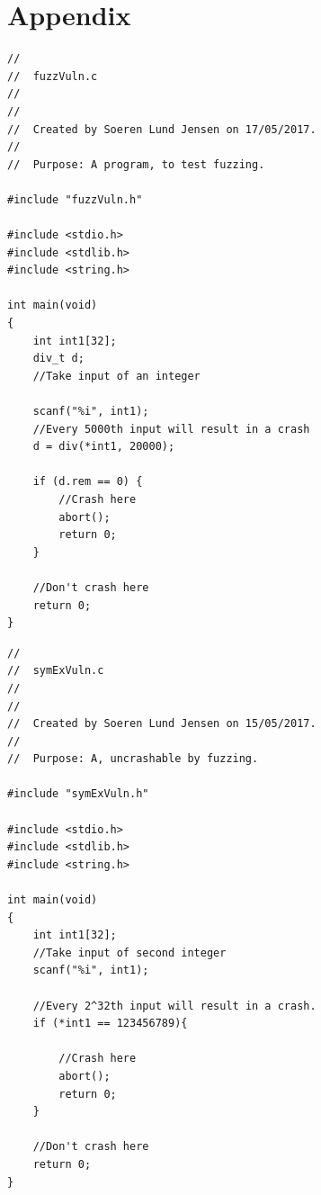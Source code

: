 \documentclass[a4paper]{article}
\begin{document}
\section{Appendix}
\begin{lstlisting}[caption=fuzzVuln.c,
label=fuzzVuln, captionpos=b]
//
//  fuzzVuln.c
//  
//
//  Created by Soeren Lund Jensen on 17/05/2017.
//
//  Purpose: A program, to test fuzzing.

#include "fuzzVuln.h"

#include <stdio.h>
#include <stdlib.h>
#include <string.h>

int main(void)
{
    int int1[32];
    div_t d;
    //Take input of an integer

    scanf("%i", int1);
    //Every 5000th input will result in a crash
    d = div(*int1, 20000);

    if (d.rem == 0) {
        //Crash here
        abort();
        return 0;
    }
    
    //Don't crash here
    return 0;
}
\end{lstlisting}
\newpage
\begin{lstlisting}[caption=symExVuln.c,
label=symExVuln, captionpos=b]
//
//  symExVuln.c
//  
//
//  Created by Soeren Lund Jensen on 15/05/2017.
//
//  Purpose: A, uncrashable by fuzzing.

#include "symExVuln.h"

#include <stdio.h>
#include <stdlib.h>
#include <string.h>

int main(void)
{
    int int1[32];
    //Take input of second integer
    scanf("%i", int1);
        
    //Every 2^32th input will result in a crash.
    if (*int1 == 123456789){
        
        //Crash here
        abort();
        return 0;
    }
    
    //Don't crash here
    return 0;
}
\end{lstlisting}

\end{document}
